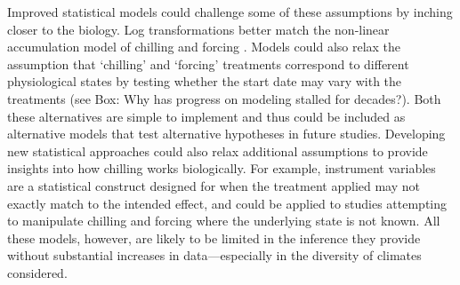 \documentclass[11pt]{article}
\begin{document}
Improved statistical models could challenge some of these assumptions by inching closer to the biology. Log transformations better match the non-linear accumulation model of chilling and forcing \citep{decsens}. Models could also relax the assumption that  `chilling' and `forcing' treatments correspond to different physiological states by testing whether the start date may vary with the treatments (see Box: Why has progress on modeling stalled for decades?). Both these alternatives are simple to implement and thus could be included as alternative models that test alternative hypotheses in future studies. Developing new statistical approaches could also relax additional assumptions to provide insights into how chilling works biologically. For example, instrument variables are a statistical construct designed for when the treatment applied may not exactly match to the intended effect, and could be applied to studies attempting to manipulate chilling and forcing where the underlying state is not known. All these models, however, are likely to be limited in the inference they provide without substantial increases in data---especially in the diversity of climates considered. 
\end{document}
